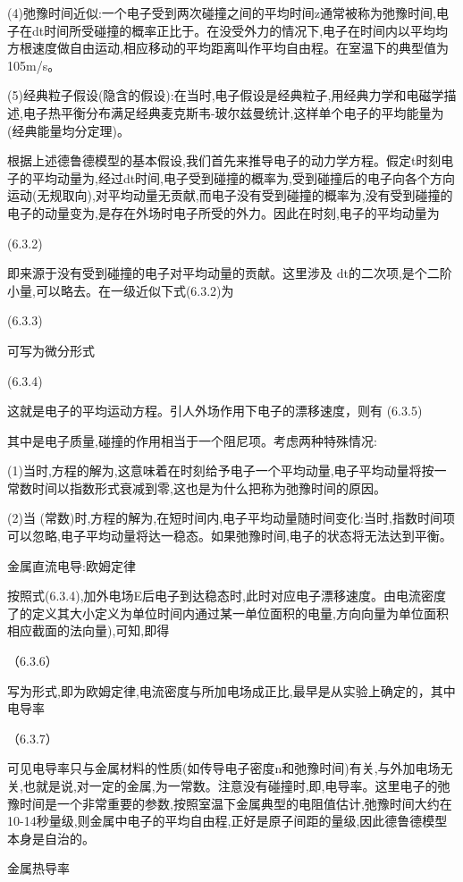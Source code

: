 (4)弛豫时间近似:一个电子受到两次碰撞之间的平均时间z通常被称为弛豫时间,电子在dt时间所受碰撞的概率正比于。在没受外力的情况下,电子在时间内以平均均方根速度做自由运动,相应移动的平均距离叫作平均自由程。在室温下的典型值为105m/s。

(5)经典粒子假设(隐含的假设):在当时,电子假设是经典粒子,用经典力学和电磁学描述,电子热平衡分布满足经典麦克斯韦-玻尔兹曼统计,这样单个电子的平均能量为 (经典能量均分定理)。

根据上述德鲁德模型的基本假设,我们首先来推导电子的动力学方程。假定t时刻电子的平均动量为,经过dt时间,电子受到碰撞的概率为,受到碰撞后的电子向各个方向运动(无规取向),对平均动量无贡献,而电子没有受到碰撞的概率为,没有受到碰撞的电子的动量变为,是存在外场时电子所受的外力。因此在时刻,电子的平均动量为

 	(6.3.2)

即来源于没有受到碰撞的电子对平均动量的贡献。这里涉及 dt的二次项,是个二阶小量,可以略去。在一级近似下式(6.3.2)为

 	(6.3.3)

可写为微分形式

	(6.3.4)

这就是电子的平均运动方程。引人外场作用下电子的漂移速度，则有	(6.3.5)

其中是电子质量,碰撞的作用相当于一个阻尼项。考虑两种特殊情况:

(1)当时,方程的解为,这意味着在时刻给予电子一个平均动量,电子平均动量将按一常数时间以指数形式衰减到零,这也是为什么把称为弛豫时间的原因。

(2)当 (常数)时,方程的解为,在短时间内,电子平均动量随时间变化:当时,指数时间项可以忽略,电子平均动量将达一稳态。如果弛豫时间,电子的状态将无法达到平衡。

金属直流电导:欧姆定律

按照式(6.3.4),加外电场E后电子到达稳态时,此时对应电子漂移速度。由电流密度了的定义其大小定义为单位时间内通过某一单位面积的电量,方向向量为单位面积相应截面的法向量),可知,即得

	（6.3.6）

写为形式,即为欧姆定律,电流密度与所加电场成正比,最早是从实验上确定的，其中电导率

	（6.3.7）

可见电导率只与金属材料的性质(如传导电子密度n和弛豫时间)有关,与外加电场无关,也就是说,对一定的金属,为一常数。注意没有碰撞时,即,电导率。这里电子的弛豫时间是一个非常重要的参数,按照室温下金属典型的电阻值估计,弛豫时间大约在10-14秒量级,则金属中电子的平均自由程,正好是原子间距的量级,因此德鲁德模型本身是自治的。

金属热导率

